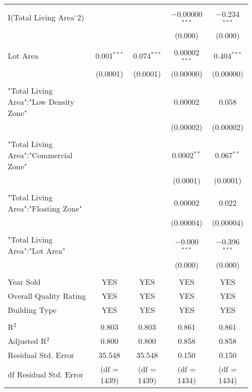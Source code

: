 \documentclass[a4paper]{article}
\begin{document}
\begin{table}[!htbp]
\begin{adjustwidth}{-0.0cm}{-0cm}
\begin{threeparttable}
\begin{tabular}{@{\extracolsep{-1pt}}lcccc}
  & & & & \\ 
 I(Total Living Area$\hat{\mkern6mu}$2) &  &  & $-$0.00000$^{***}$ & $-$0.234$^{***}$ \\ 
  &  &  & (0.000) & (0.000) \\ 
  & & & & \\ 
 Lot Area & 0.001$^{***}$ & 0.074$^{***}$ & 0.00002$^{***}$ & 0.404$^{***}$ \\ 
  & (0.0001) & (0.0001) & (0.00000) & (0.00000) \\ 
  & & & & \\ 
 "Total Living Area":"Low Density Zone" &  &  & 0.00002 & 0.058 \\ 
  &  &  & (0.00002) & (0.00002) \\ 
  & & & & \\ 
 "Total Living Area":"Commercial Zone" &  &  & 0.0002$^{**}$ & 0.067$^{**}$ \\ 
  &  &  & (0.0001) & (0.0001) \\ 
  & & & & \\ 
 "Total Living Area":"Floating Zone" &  &  & 0.00002 & 0.022 \\ 
  &  &  & (0.00004) & (0.00004) \\ 
  & & & & \\ 
 "Total Living Area":"Lot Area" &  &  & $-$0.000$^{***}$ & $-$0.396$^{***}$ \\ 
  &  &  & (0.000) & (0.000) \\ 
  & & & & \\ 
  Year Sold & YES & YES & YES & YES \\ 
  Overall Quality Rating & YES & YES & YES & YES \\  
  Building Type & YES & YES & YES & YES \\ 
\hline \\[-1.8ex] 
R$^{2}$ & 0.803 & 0.803 & 0.861 & 0.861 \\ 
Adjusted R$^{2}$ & 0.800 & 0.800 & 0.858 & 0.858 \\ 
Residual Std. Error & 35.548 & 35.548  & 0.150  & 0.150 \\
df Residual Std. Error & (df = 1439) & (df = 1439) & (df = 1434) & (df = 1434)\\

\end{tabular}
\end{threeparttable}
\end{adjustwidth}
\end{table}
\end{document}
